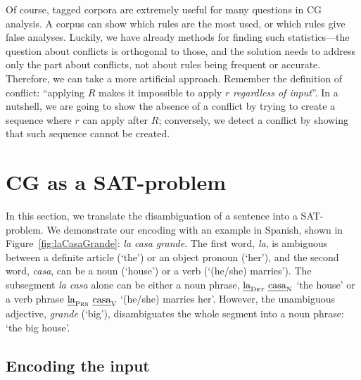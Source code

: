 Of course, tagged corpora are extremely useful for many questions in CG analysis.
A corpus can show which rules are the most used, or which rules give false analyses. 
Luckily, we have already methods for finding such statistics---the question 
about conflicts is orthogonal to those, and the solution needs to address only 
the part about conflicts, not about rules being frequent or accurate.
Therefore, we can take a more artificial approach. %
Remember the definition of conflict: ``applying $R$ makes it impossible to apply $r$ \emph{regardless of input}''.
In a nutshell, we are going to show the absence of a conflict by trying to create 
a sequence where $r$ can apply after $R$; conversely, we detect a conflict by 
showing that such sequence cannot be created.

\section{CG as a SAT-problem}
\label{sec:CGSAT}

In this section, we translate the disambiguation of a sentence into a SAT-problem.
We demonstrate our encoding with an example in Spanish, shown in
Figure~\ref{fig:laCasaGrande}: {\em la casa grande}. %
The first word, {\em la}, is ambiguous between a definite article
(`the') or an object pronoun (`her'), and the second word, {\em casa},
can be a noun (`house') or a verb (`(he/she) marries'). 
The subsegment {\em la casa} alone can be either a noun phrase, $\text{\em la}_{\text{\sc Det}} \ \text{\em casa}_{\text{\sc N}}$ 
`the house'  or a verb phrase $\text{\em la}_{\text{\sc Prn}} \ \text{\em casa}_{\text{\sc V}}$   `(he/she) marries her'. 
However, the unambiguous adjective, {\em grande} (`big'),
disambiguates the whole segment into a noun phrase: `the big house'.
%

\subsection{Encoding the input}

